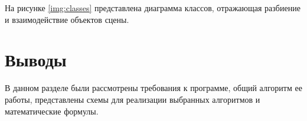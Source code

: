 На рисунке \ref{img:classes} представлена диаграмма классов, отражающая разбиение и взаимодействие объектов сцены.

\newpage


\captionsetup{singlelinecheck = false, justification=centering}

\section{Выводы}

В данном разделе были рассмотрены требования к программе, общий алгоритм ее работы, представлены схемы для реализации выбранных алгоритмов и математические формулы.
